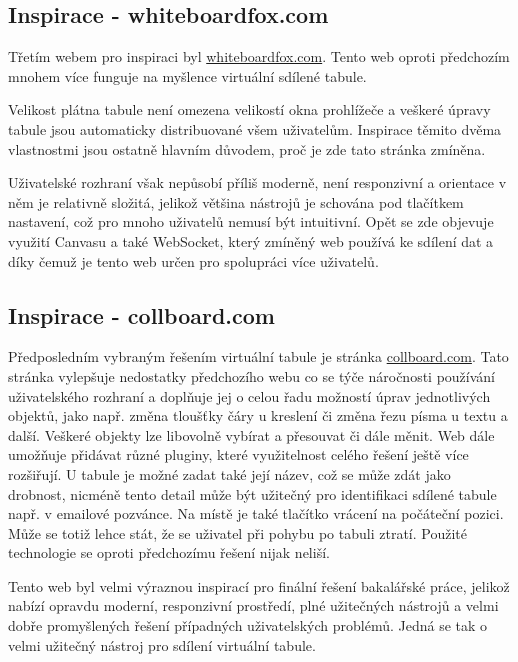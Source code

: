 \subsection{Inspirace - whiteboardfox.com}
\label{sec:2.4}
Třetím webem pro inspiraci byl \underline{whiteboardfox.com}.
Tento web oproti předchozím mnohem více funguje na myšlence virtuální sdílené tabule.

Velikost plátna tabule není omezena velikostí okna prohlížeče a veškeré úpravy tabule jsou automaticky distribuované všem uživatelům.
Inspirace těmito dvěma vlastnostmi jsou ostatně hlavním důvodem, proč je zde tato stránka zmíněna.

Uživatelské rozhraní však nepůsobí příliš moderně, není responzivní a orientace v něm je relativně složitá, jelikož většina nástrojů je schována pod tlačítkem nastavení, což pro mnoho uživatelů nemusí být intuitivní.
Opět se zde objevuje využití Canvasu a také WebSocket, který zmíněný web používá ke sdílení dat a díky čemuž je tento web určen pro spolupráci více uživatelů.



\subsection{Inspirace - collboard.com}
\label{sec:2.5}
Předposledním vybraným řešením virtuální tabule je stránka \underline{collboard.com}.
Tato stránka vylepšuje nedostatky předchozího webu co se týče náročnosti používání uživatelského rozhraní a doplňuje jej o celou řadu možností úprav jednotlivých objektů, jako např. změna tloušťky čáry u kreslení či změna řezu písma u textu a další.
Veškeré objekty lze libovolně vybírat a přesouvat či dále měnit.
Web dále umožňuje přidávat různé pluginy, které využitelnost celého řešení ještě více rozšiřují.
U tabule je možné zadat také její název, což se může zdát jako drobnost, nicméně tento detail může být užitečný pro identifikaci sdílené tabule např. v emailové pozvánce.
Na místě je také tlačítko vrácení na počáteční pozici.
Může se totiž lehce stát, že se uživatel při pohybu po tabuli ztratí.
Použité technologie se oproti předchozímu řešení nijak neliší.

Tento web byl velmi výraznou inspirací pro finální řešení bakalářské práce, jelikož nabízí opravdu moderní, responzivní prostředí, plné užitečných nástrojů a velmi dobře promyšlených řešení případných uživatelských problémů.
Jedná se tak o velmi užitečný nástroj pro sdílení virtuální tabule.



